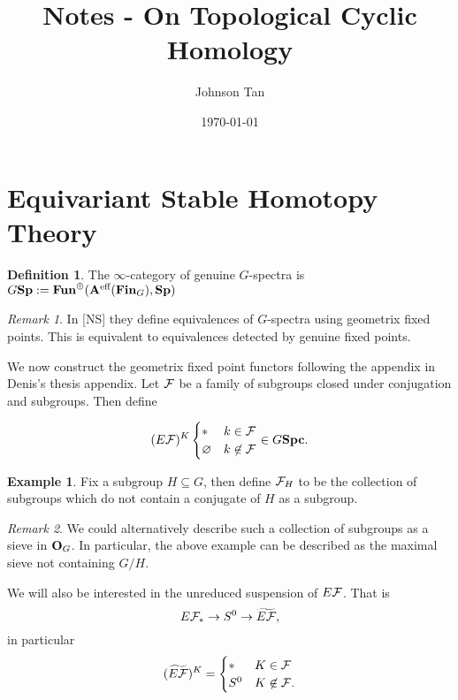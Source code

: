 \documentclass[letterpaper]{article}
\theoremstyle{definition}
\newtheorem{definition}{Definition}[section]
\newtheorem{ex}{Example}
\theoremstyle{remark}
\newtheorem{remark}{Remark}
\theoremstyle{plain}
\begin{document}
\title{Notes - On Topological Cyclic Homology}
\author{Johnson Tan}
\date{\today}
\maketitle

\tableofcontents

\section{Equivariant Stable Homotopy Theory}


\begin{definition}
The $\infty$-category of genuine $G$-spectra is $G\mathbf{Sp} := \mathbf{Fun}^\oplus(\mathbf{A}^\textnormal{eff}(\mathbf{Fin}_G),\mathbf{Sp})$
\end{definition}

\begin{remark}
In [NS] they define equivalences of $G$-spectra using geometrix fixed points. This is equivalent to equivalences detected by genuine fixed points.
\end{remark}

We now construct the geometrix fixed point functors following the appendix in Denis's thesis appendix. Let $\mathcal{F}$ be a family of subgroups closed under conjugation and subgroups. Then define

\[
(E\mathcal{F})^K
\begin{cases}
		* & k\in\mathcal{F}\\
		\varnothing & k\not\in\mathcal{F}
\end{cases}
\in G\mathbf{Spc}.
\]

\begin{ex}
		Fix a subgroup $H\subseteq G$, then define $\mathcal{F}_H$ to be the collection of subgroups which do not contain a conjugate of $H$ as a subgroup.
\end{ex}

\begin{remark}
		We could alternatively describe such a collection of subgroups as a sieve in $\mathbf{O}_G$. In particular, the above example can be described as the maximal sieve not containing $G/H$.
\end{remark}

We will also be interested in the unreduced suspension of $E\mathcal{F}$. That is
$$E\mathcal{F}_*\rightarrow S^0\rightarrow \widetilde{E\mathcal{F}},$$
in particular
\[
(\widetilde{E\mathcal{F}})^K =
\begin{cases}
		*	&	K\in\mathcal{F}\\
		S^0	&	K\not\in\mathcal{F}.
\end{cases}
\]
\end{document}
